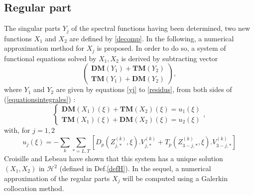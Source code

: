 \subsection{Regular part}
\label{regpart}
The singular parts $Y_j$ of the spectral functions having been determined, two new functions $X_1$ and $X_2$ are defined by \eqref{decomp}. In the following, a numerical approximation method for $X_j$ is proposed. In order to do so, a system of functional equations solved by $X_1, X_2$ is derived by subtracting vector
\begin{equation}
\begin{pmatrix}
\textbf{DM}(Y_1)+\textbf{TM}(Y_2) \\
\textbf{TM}(Y_1)+\textbf{DM}(Y_2)
\end{pmatrix},
\end{equation}
where $Y_1$ and $Y_2$ are given by equations \eqref{yj} to \eqref{residus}, from both sides of (\ref{equationsintegrales}) :
\begin{equation}
\left\{ 
\begin{matrix}
\textbf{DM}(X_1)(\xi)+\textbf{TM}(X_2)(\xi)=u_1(\xi)\\
\textbf{TM}(X_1)(\xi)+\textbf{DM}(X_2)(\xi)=u_2(\xi)
\end{matrix}
\right.,
\label{regparteqn}
\end{equation}
with, for $j=1,2$
\begin{equation}
u_j(\xi)=-\sum_k \sum_{*=L,T} \left[ D_p(Z_{j,*}^{(k)},\xi).V_{j,*}^{(k)}+T_p(Z_{3-j,*}^{(k)},\xi).V_{3-j,*}^{(k)}\right]
\label{scndmembre}
\end{equation}
Croisille and Lebeau \cite{CroisilleLebeau} have shown that this system has a unique solution $(X_1,X_2)$ in $\mathcal{H}^2$ (defined in Def.\ref{defH}). In the sequel, a numerical approximation of the regular parts $X_j$ will be computed using a Galerkin collocation method.

